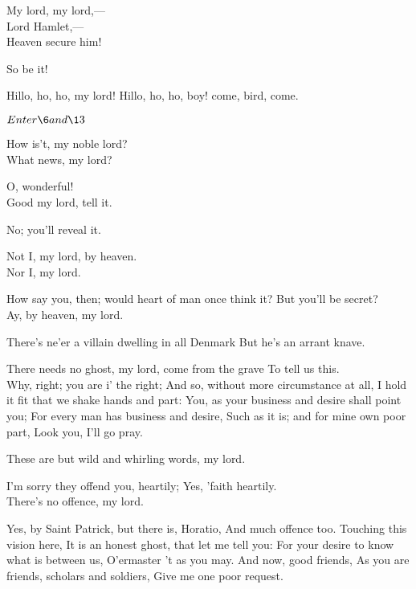 \documentclass[11pt]{book}
\begin{document}
\6   My lord, my lord,--- \\[---]


		Lord Hamlet,--- \\[---]

\6		Heaven secure him!

\aparte\1	So be it!

\6	  Hillo, ho, ho, my lord!
\1	Hillo, ho, ho, boy! come, bird, come.

	\(Enter \6 and \13\)

	How is't, my noble lord? \\

\6	What news, my lord?

\1	O, wonderful! \\

\6	                  Good my lord, tell it.

\1	No; you'll reveal it.

\6	Not I, my lord, by heaven. \\

	Nor I, my lord.

\1	How say you, then; would heart of man once think it?
	But you'll be secret? \\


  Ay, by heaven, my lord.


\1	There's ne'er a villain dwelling in all Denmark
	But he's an arrant knave.

\6	There needs no ghost, my lord, come from the grave
	To tell us this. \\

\1	                  Why, right; you are i' the right;
	And so, without more circumstance at all,
	I hold it fit that we shake hands and part:
	You, as your business and desire shall point you;
	For every man has business and desire,
	Such as it is; and for mine own poor part,
	Look you, I'll go pray.

\6	These are but wild and whirling words, my lord.

\1	I'm sorry they offend you, heartily;
	Yes, 'faith heartily. \\

\6	There's no offence, my lord.

\1	Yes, by Saint Patrick, but there is, Horatio,
	And much offence too. Touching this vision here,
	It is an honest ghost, that let me tell you:
	For your desire to know what is between us,
	O'ermaster 't as you may. And now, good friends,
	As you are friends, scholars and soldiers,
	Give me one poor request.
\end{document}
